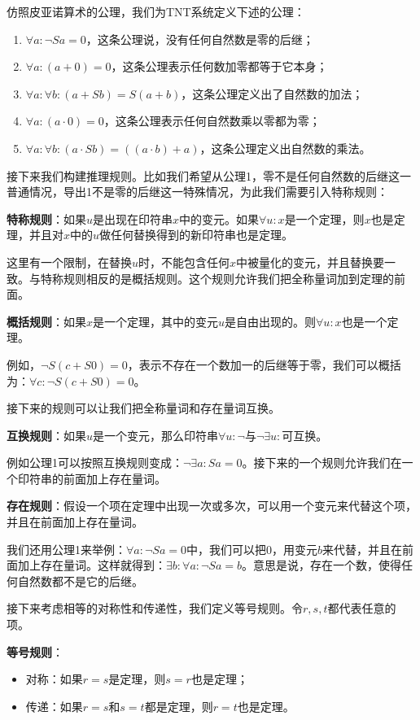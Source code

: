 \documentclass{article}
\begin{document}
仿照皮亚诺算术的公理，我们为TNT系统定义下述的公理：

\begin{enumerate}
\item $\forall a : \lnot Sa = 0$，这条公理说，没有任何自然数是零的后继；
\item $\forall a: (a + 0) = 0$，这条公理表示任何数加零都等于它本身；
\item $\forall a: \forall b: (a + Sb) = S(a + b)$，这条公理定义出了自然数的加法；
\item $\forall a: (a \cdot 0) = 0$，这条公理表示任何自然数乘以零都为零；
\item $\forall a: \forall b: (a \cdot Sb) = ((a \cdot b) + a)$，这条公理定义出自然数的乘法。
\end{enumerate}

接下来我们构建推理规则。比如我们希望从公理1，零不是任何自然数的后继这一普通情况，导出1不是零的后继这一特殊情况，为此我们需要引入特称规则：

\textbf{特称规则}：如果$u$是出现在印符串$x$中的变元。如果$\forall u: x$是一个定理，则$x$也是定理，并且对$x$中的$u$做任何替换得到的新印符串也是定理。

这里有一个限制，在替换$u$时，不能包含任何$x$中被量化的变元，并且替换要一致。与特称规则相反的是概括规则。这个规则允许我们把全称量词加到定理的前面。

\textbf{概括规则}：如果$x$是一个定理，其中的变元$u$是自由出现的。则$\forall u: x$也是一个定理。

例如，$\lnot S(c + S0) = 0$，表示不存在一个数加一的后继等于零，我们可以概括为：$\forall c: \lnot S(c + S0) = 0$。

接下来的规则可以让我们把全称量词和存在量词互换。

\textbf{互换规则}：如果$u$是一个变元，那么印符串$\forall u: \lnot $与$\lnot \exists u:$可互换。

例如公理1可以按照互换规则变成：$\lnot \exists a: Sa = 0$。接下来的一个规则允许我们在一个印符串的前面加上存在量词。

\textbf{存在规则}：假设一个项在定理中出现一次或多次，可以用一个变元来代替这个项，并且在前面加上存在量词。

我们还用公理1来举例：$\forall a: \lnot Sa = 0$中，我们可以把0，用变元$b$来代替，并且在前面加上存在量词。这样就得到：$\exists b: \forall a: \lnot Sa = b$。意思是说，存在一个数，使得任何自然数都不是它的后继。

接下来考虑相等的对称性和传递性，我们定义等号规则。令$r, s, t$都代表任意的项。

\textbf{等号规则}：
\begin{itemize}
\item 对称：如果$r = s$是定理，则$s = r$也是定理；
\item 传递：如果$r = s$和$s = t$都是定理，则$r = t$也是定理。
\end{itemize}
\end{document}
